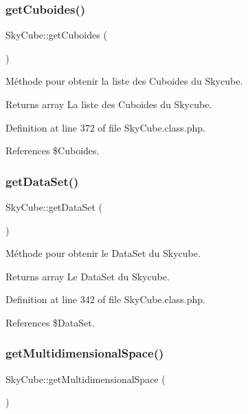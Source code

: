 \subsubsection{\texorpdfstring{get\+Cuboides()}{getCuboides()}}
{\footnotesize\ttfamily Sky\+Cube\+::get\+Cuboides (\begin{DoxyParamCaption}{ }\end{DoxyParamCaption})}

Méthode pour obtenir la liste des Cuboides du Skycube.

\begin{DoxyReturn}{Returns}
array La liste des Cuboides du Skycube. 
\end{DoxyReturn}


Definition at line 372 of file Sky\+Cube.\+class.\+php.



References \$\+Cuboides.

\mbox{\label{class_sky_cube_a3627e6be0bf4eb22fde5a7d422ec60d1}} 
\subsubsection{\texorpdfstring{get\+Data\+Set()}{getDataSet()}}
{\footnotesize\ttfamily Sky\+Cube\+::get\+Data\+Set (\begin{DoxyParamCaption}{ }\end{DoxyParamCaption})}

Méthode pour obtenir le Data\+Set du Skycube.

\begin{DoxyReturn}{Returns}
array Le Data\+Set du Skycube. 
\end{DoxyReturn}


Definition at line 342 of file Sky\+Cube.\+class.\+php.



References \$\+Data\+Set.

\mbox{\label{class_sky_cube_ad6426ecd7f39e86656afa4de4db347b5}} 
\subsubsection{\texorpdfstring{get\+Multidimensional\+Space()}{getMultidimensionalSpace()}}
{\footnotesize\ttfamily Sky\+Cube\+::get\+Multidimensional\+Space (\begin{DoxyParamCaption}{ }\end{DoxyParamCaption})}

